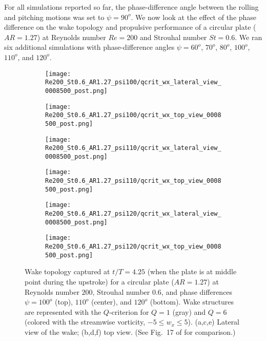 For all simulations reported so far, the phase-difference angle between the rolling and pitching motions was set to $\psi = 90^o$.
We now look at the effect of the phase difference on the wake topology and propulsive performance of a circular plate ($AR = 1.27$) at Reynolds number $Re = 200$ and Strouhal number $St = 0.6$.
We ran six additional simulations with phase-difference angles $\psi = 60^o$, $70^o$, $80^o$, $100^o$, $110^o$, and $120^o$.

\begin{figure}[!h]
  \centering
  \begin{subfigure}[]{0.45\textwidth}
    \centering
    \texttt{[image: Re200\_St0.6\_AR1.27\_psi100/qcrit\_wx\_lateral\_view\_0008500\_post.png]}
    \caption{}
    \label{fig:phase_wake_topology:100_lateral}
  \end{subfigure}
  \hfill
  \begin{subfigure}[]{0.45\textwidth}
    \centering
    \texttt{[image: Re200\_St0.6\_AR1.27\_psi100/qcrit\_wx\_top\_view\_0008500\_post.png]}
    \caption{}
    \label{fig:phase_wake_topology:100_top}
  \end{subfigure}
  \vspace{1cm}
  \begin{subfigure}[]{0.45\textwidth}
    \centering
    \texttt{[image: Re200\_St0.6\_AR1.27\_psi110/qcrit\_wx\_lateral\_view\_0008500\_post.png]}
    \caption{}
    \label{fig:phase_wake_topology:110_lateral}
  \end{subfigure}
  \hfill
  \begin{subfigure}[]{0.45\textwidth}
    \centering
    \texttt{[image: Re200\_St0.6\_AR1.27\_psi110/qcrit\_wx\_top\_view\_0008500\_post.png]}
    \caption{}
    \label{fig:phase_wake_topology:110_top}
  \end{subfigure}
  \vspace{1cm}
  \begin{subfigure}[]{0.45\textwidth}
    \centering
    \texttt{[image: Re200\_St0.6\_AR1.27\_psi120/qcrit\_wx\_lateral\_view\_0008500\_post.png]}
    \caption{}
    \label{fig:phase_wake_topology:120_lateral}
  \end{subfigure}
  \hfill
  \begin{subfigure}[]{0.45\textwidth}
    \centering
    \texttt{[image: Re200\_St0.6\_AR1.27\_psi120/qcrit\_wx\_top\_view\_0008500\_post.png]}
    \caption{}
    \label{fig:phase_wake_topology:120_top}
  \end{subfigure}
  \caption{Wake topology captured at $t / T = 4.25$ (when the plate is at middle point during the upstroke) for a circular plate ($AR = 1.27$) at Reynolds number $200$, Strouhal number $0.6$, and phase differences $\psi = 100^o$ (top), $110^o$ (center), and $120^o$ (bottom). Wake structures are represented with the $Q$-criterion for $Q = 1$ (gray) and $Q = 6$ (colored with the streamwise vorticity, $-5 \leq w_x \leq 5$). (a,c,e) Lateral view of the wake; (b,d,f) top view. (See Fig.~17 of \citet{li_dong_2016} for comparison.)}
  \label{fig:phase_wake_topology}
\end{figure}

